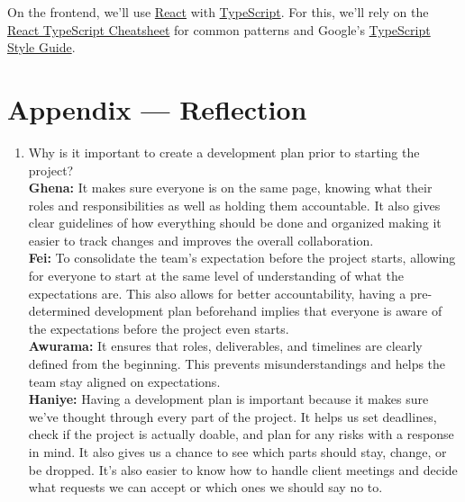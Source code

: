 \documentclass{article}
\begin{document}
On the frontend, we’ll use \href{https://react.dev/}{React} with \href{https://www.typescriptlang.org/}{TypeScript}. For this, we’ll rely on the \href{https://react-typescript-cheatsheet.netlify.app/}{React TypeScript Cheatsheet} for common patterns and Google’s \href{https://google.github.io/styleguide/tsguide.html}{TypeScript Style Guide}.

\newpage{}

\section*{Appendix --- Reflection}

\begin{enumerate}
    \item Why is it important to create a development plan prior to starting the
    project? \\
    \textbf{Ghena: } It makes sure everyone is on the same page, knowing what their roles and responsibilities as well as holding them accountable. It also gives clear guidelines of how everything should be done and organized making it easier to track changes and improves the overall collaboration.
    \\\textbf{Fei:} To consolidate the team’s expectation before the project starts, allowing for everyone to start at the same level of understanding of what the expectations are. This also allows for better accountability, having a pre-determined development plan beforehand implies that everyone is aware of the expectations before the project even starts.
    \\\textbf{Awurama:} It ensures that roles, deliverables, and timelines are clearly defined
    from the beginning. This prevents misunderstandings and helps the team stay aligned
    on expectations.
    \\\textbf{Haniye:} Having a development plan is important because it makes sure we’ve thought through every part of the project. It helps us set deadlines, check if the project is actually doable, and plan for any risks with a response in mind. It also gives us a chance to see which parts should stay, change, or be dropped. It’s also easier to know how to handle client meetings and decide what requests we can accept or which ones we should say no to.


\end{enumerate}
\end{document}
